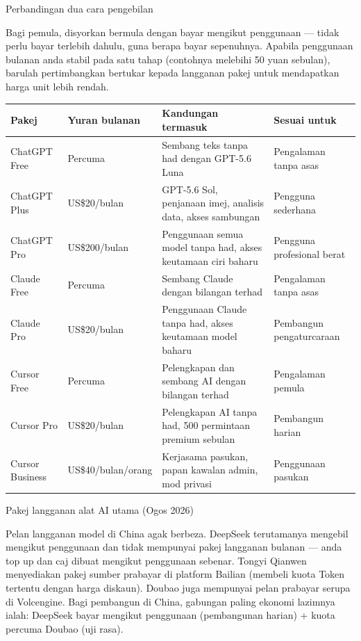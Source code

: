 \begin{center}\small\color{gray}Perbandingan dua cara pengebilan\end{center}

Bagi pemula, disyorkan bermula dengan bayar mengikut penggunaan — tidak perlu bayar terlebih dahulu, guna berapa bayar sepenuhnya. Apabila penggunaan bulanan anda stabil pada satu tahap (contohnya melebihi 50 yuan sebulan), barulah pertimbangkan bertukar kepada langganan pakej untuk mendapatkan harga unit lebih rendah.


\begin{center}
\begin{tabularx}{\linewidth}{|X|X|X|X|}
\hline
\textbf{Pakej} & \textbf{Yuran bulanan} & \textbf{Kandungan termasuk} & \textbf{Sesuai untuk} \tabularnewline
\hline
ChatGPT Free & Percuma & Sembang teks tanpa had dengan GPT-5.6 Luna & Pengalaman tanpa asas \tabularnewline
ChatGPT Plus & US\$20/bulan & GPT-5.6 Sol, penjanaan imej, analisis data, akses sambungan & Pengguna sederhana \tabularnewline
ChatGPT Pro & US\$200/bulan & Penggunaan semua model tanpa had, akses keutamaan ciri baharu & Pengguna profesional berat \tabularnewline
Claude Free & Percuma & Sembang Claude dengan bilangan terhad & Pengalaman tanpa asas \tabularnewline
Claude Pro & US\$20/bulan & Penggunaan Claude tanpa had, akses keutamaan model baharu & Pembangun pengaturcaraan \tabularnewline
Cursor Free & Percuma & Pelengkapan dan sembang AI dengan bilangan terhad & Pengalaman pemula \tabularnewline
Cursor Pro & US\$20/bulan & Pelengkapan AI tanpa had, 500 permintaan premium sebulan & Pembangun harian \tabularnewline
Cursor Business & US\$40/bulan/orang & Kerjasama pasukan, papan kawalan admin, mod privasi & Penggunaan pasukan \tabularnewline
\hline
\end{tabularx}
\end{center}

\begin{center}\small\color{gray}Pakej langganan alat AI utama (Ogos 2026)\end{center}

Pelan langganan model di China agak berbeza. DeepSeek terutamanya mengebil mengikut penggunaan dan tidak mempunyai pakej langganan bulanan — anda top up dan caj dibuat mengikut penggunaan sebenar. Tongyi Qianwen menyediakan pakej sumber prabayar di platform Bailian (membeli kuota Token tertentu dengan harga diskaun). Doubao juga mempunyai pelan prabayar serupa di Volcengine. Bagi pembangun di China, gabungan paling ekonomi lazimnya ialah: DeepSeek bayar mengikut penggunaan (pembangunan harian) + kuota percuma Doubao (uji rasa).

